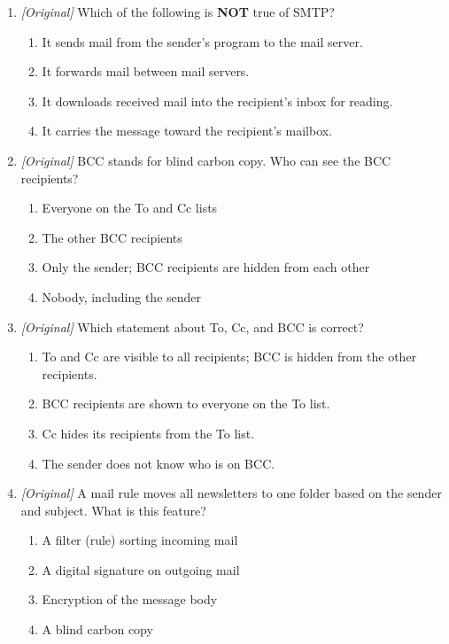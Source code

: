 \begin{enumerate}[label=\textbf{Q\arabic*.}, leftmargin=*]
\begin{enumerate}[label=\Alph*.]
    \item SSL then TLS
  \end{enumerate}
\item \textit{[Original]} Which of the following is \textbf{NOT} true of SMTP?
  \begin{enumerate}[label=\Alph*.]
    \item It sends mail from the sender's program to the mail server.
    \item It forwards mail between mail servers.
    \item It downloads received mail into the recipient's inbox for reading.
    \item It carries the message toward the recipient's mailbox.
  \end{enumerate}
\item \textit{[Original]} BCC stands for blind carbon copy. Who can see the
  BCC recipients?
  \begin{enumerate}[label=\Alph*.]
    \item Everyone on the To and Cc lists
    \item The other BCC recipients
    \item Only the sender; BCC recipients are hidden from each other
    \item Nobody, including the sender
  \end{enumerate}
\item \textit{[Original]} Which statement about To, Cc, and BCC is correct?
  \begin{enumerate}[label=\Alph*.]
    \item To and Cc are visible to all recipients; BCC is hidden from the other recipients.
    \item BCC recipients are shown to everyone on the To list.
    \item Cc hides its recipients from the To list.
    \item The sender does not know who is on BCC.
  \end{enumerate}
\item \textit{[Original]} A mail rule moves all newsletters to one folder
  based on the sender and subject. What is this feature?
  \begin{enumerate}[label=\Alph*.]
    \item A filter (rule) sorting incoming mail
    \item A digital signature on outgoing mail
    \item Encryption of the message body
    \item A blind carbon copy

\end{enumerate}
\end{enumerate}
